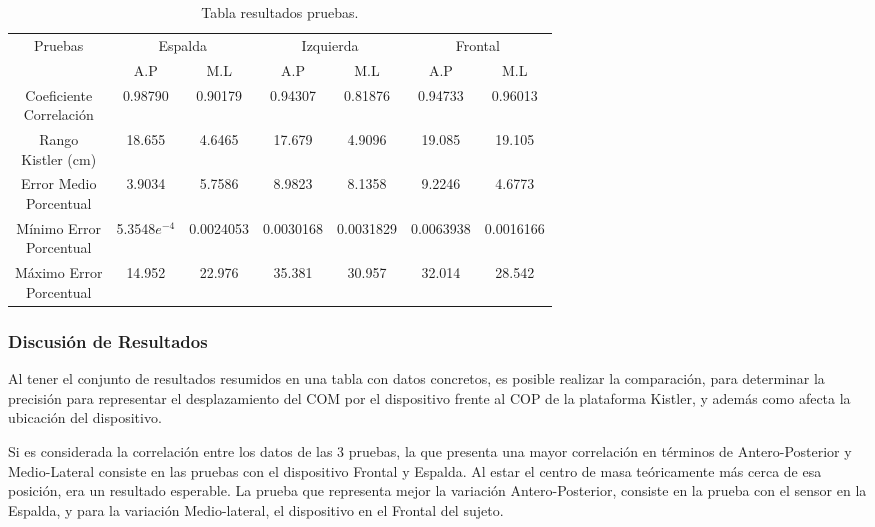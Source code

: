 \documentclass[12pt,a4paper]{article}
\begin{document}
\begin{table}[H]
	\centering
	\begin{tabular}{|c|c|c|c|c|c|c|}
		\hline
		\multirow{2}{*}{Pruebas} &
		\multicolumn{2}{c|}{Espalda} &
		\multicolumn{2}{c|}{Izquierda} &
		\multicolumn{2}{c|}{Frontal} \\
		\cline{2-7}
		& A.P & M.L & A.P  & M.L & A.P & M.L \\
		\hline
		\shortstack{Coeficiente\\Correlación} & 0.98790 &0.90179 & 0.94307 & 0.81876 & 0.94733 & 0.96013 \\
		\hline
		\shortstack{Rango\\Kistler (cm)} & 18.655 & 4.6465 & 17.679 & 4.9096 & 19.085 & 19.105 \\
		\hline
		\shortstack{Error Medio\\Porcentual} & 3.9034 & 5.7586 & 8.9823 & 8.1358 & 9.2246 & 4.6773 \\
		\hline
		\shortstack{Mínimo Error\\Porcentual} & 5.3548$e^{-4}$ & 0.0024053 & 0.0030168 & 0.0031829 & 0.0063938 & 0.0016166 \\
		\hline
		\shortstack{Máximo Error\\Porcentual} & 14.952 & 22.976 & 35.381& 30.957 & 32.014 & 28.542 \\
		\hline
	\end{tabular}
	\caption{Tabla resultados pruebas.}
	\label{table:resultadosPruebas}
\end{table}	

\subsubsection{Discusión de Resultados}
Al tener el conjunto de resultados resumidos en una tabla con datos concretos, es posible realizar la comparación, para determinar la precisión para representar el desplazamiento del COM por el dispositivo frente al COP de la plataforma Kistler, y además como afecta la ubicación del dispositivo.

Si es considerada la correlación entre los datos de las 3 pruebas, la que presenta una mayor correlación en términos de Antero-Posterior y Medio-Lateral consiste en las pruebas con el dispositivo Frontal y Espalda. Al estar el centro de masa teóricamente más cerca de esa posición, era un resultado esperable. La prueba que representa mejor la variación Antero-Posterior, consiste en la prueba con el sensor en la Espalda, y para la variación Medio-lateral, el dispositivo en el Frontal del sujeto.
\end{document}

